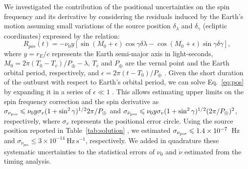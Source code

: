 \documentclass[fleqn,usenatbib]{mnras}
\begin{document}
We investigated the contribution of the positional uncertainties on the spin frequency and its derivative by considering the residuals induced by the Earth's motion assuming small variations of the source position $\delta_{\lambda}$ and $\delta_{\gamma}$ (ecliptic coordinates) expressed by the relation:
\begin{equation}
R_{pos}(t) = - \nu_0 y [\sin(M_0+\epsilon)\cos \gamma \delta\lambda -  \cos(M_0+\epsilon)\sin \gamma \delta\gamma],
\label{eq:pos}
\end{equation}
where $y=r_E/c$ represents the Earth semi-major axis in light-seconds, $M_0=2 \pi (T_0-T_{v})/P_{\oplus}-\lambda$, $T_{v}$ and $P_{\oplus}$ are the vernal point and the Earth orbital period, respectively, and $\epsilon=2\pi(t-T_0)/P_{\oplus}$ \citep[see, e.g.,][]{Lyne90}. Given the short duration of the outburst with respect to Earth's orbital period, we can solve Eq.~\ref{eq:pos} by expanding it in a series of $\epsilon\ll1$ \cite[see e.g.,][and references therein]{Burderi:2007tl}. This allows estimating upper limits on the spin frequency correction and the spin derivative as $\sigma_{\nu_{\rm pos}}\leq \nu_0y\sigma_{v}(1+\sin^2\gamma)^{1/2}2\pi/P_{\oplus}$ and $\sigma_{\dot{\nu}_{\rm pos}}\leq \nu_0y\sigma_{v}(1+\sin^2\gamma)^{1/2}(2\pi/P_{\oplus})^2$, respectively, where $\sigma_{v}$ represents the positional error circle. Using the source position reported in Table~\ref{tab:solution} \citep{Jonker:2013wp}, we estimated $\sigma_{\nu_{\rm pos}} \leq 1.4\times 10^{-7}$~Hz and $\sigma_{\dot{\nu}_{pos}} \leq 3\times 10^{-14}~\text{Hz}~\text{s}^{-1}$, respectively. We added in quadrature these systematic uncertainties to the statistical errors of $\nu_0$ and $\dot{\nu}$ estimated from the timing analysis.
\end{document}
